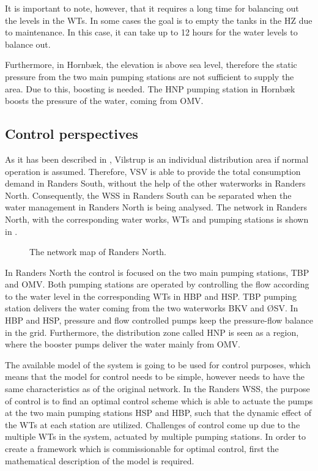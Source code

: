 \vspace{-3mm}
It is important to note, however, that it requires a long time for balancing out the levels in the WTs. In some cases the goal is to empty the tanks in the HZ due to maintenance. In this case, it can take up to 12 hours for the water levels to balance out.  

Furthermore, in Hornbæk, the elevation is above sea level, therefore the static pressure from the two main pumping stations are not sufficient to supply the area. Due to this, boosting is needed. The HNP pumping station in Hornbæk boosts the pressure of the water, coming from OMV. 

\subsection{Control perspectives}
\label{Randers_wss_summary}

As it has been described in , Vilstrup is an individual distribution area if normal operation is assumed. Therefore, VSV is able to provide the total consumption demand in Randers South, without the help of the other waterworks in Randers North. Consequently, the WSS in Randers South can be separated when the water management in Randers North is being analysed. The network in Randers North, with the corresponding water works, WTs and pumping stations is shown in . 

\begin{figure}[H]
\centering

\caption{The network map of Randers North.}
\label{fig:simplified_network}
\end{figure}
\vspace{-3mm}

In Randers North the control is focused on the two main pumping stations, TBP and OMV. Both pumping stations are operated by controlling the flow according to the water level in the corresponding WTs in HBP and HSP. TBP pumping station delivers the water coming from the two waterworks BKV and ØSV. In HBP and HSP, pressure and flow controlled pumps keep the pressure-flow balance in the grid. Furthermore, the distribution zone called HNP is seen as a region, where the booster pumps deliver the water mainly from OMV. 

The available model of the system is going to be used for control purposes, which means that the model for control needs to be simple, however needs to have the same characteristics as of the original network. In the Randers WSS, the purpose of control is to find an optimal control scheme which is able to actuate the pumps at the two main pumping stations HSP and HBP, such that the dynamic effect of the WTs at each station are utilized. Challenges of control come up due to the multiple WTs in the system, actuated by multiple pumping stations. In order to create a framework which is commissionable for optimal control, first the mathematical description of the model is required. 

